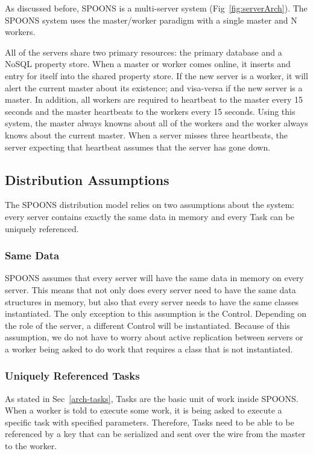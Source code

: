 \documentclass[12pt]{ucthesis}
\begin{document}
As discussed before, SPOONS is a multi-server system (Fig~\ref{fig:serverArch}).
The SPOONS system uses the master/worker paradigm with a single master and N workers.

All of the servers share two primary resources: the primary database and a NoSQL property store.
When a master or worker comes online, it inserts and entry for itself into the shared property store.
If the new server is a worker, it will alert the current master about its existence; and visa-versa
if the new server is a master. In addition, all workers are required to heartbeat to the master every
15 seconds and the master heartbeats to the workers every 15 seconds. Using this system, the master
always knowns about all of the workers and the worker always knows about the current master.
When a server misses three heartbeats, the server expecting that heartbeat assumes that the server has
gone down.

\subsection{Distribution Assumptions}
\label{arch-dist-assumptions}

The SPOONS distribution model relies on two assumptions about the system: every server contains
exactly the same data in memory and every Task can be uniquely referenced.

\subsubsection{Same Data}
SPOONS assumes that every server will have the same data in memory on every server.
This means that not only does every server need to have the same data structures in memory,
but also that every server needs to have the same classes instantiated. The only exception to this
assumption is the Control. Depending on the role of the server, a different Control will be
instantiated. Because of this assumption, we do not have to worry about active replication
between servers or a worker being asked to do work that requires a class that is not instantiated.

\subsubsection{Uniquely Referenced Tasks}
As stated in Sec~\ref{arch-tasks}, Tasks are the basic unit of work inside SPOONS.
When a worker is told to execute some work, it is being asked to execute a specific task with specified
parameters. Therefore, Tasks need to be able to be referenced by a key that can be serialized and
sent over the wire from the master to the worker.
\end{document}
